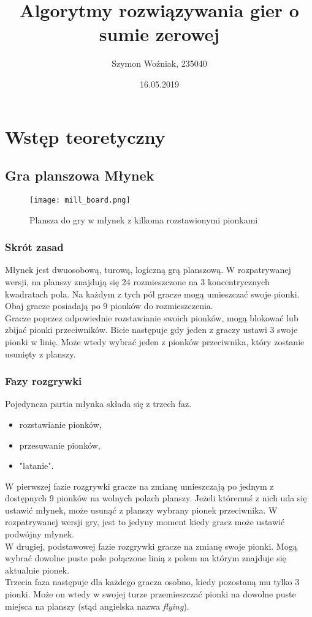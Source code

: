 \documentclass{article}
\author{Szymon Woźniak, 235040}
\date{16.05.2019}
\title{Algorytmy rozwiązywania gier o sumie zerowej}
\begin{document}
	\maketitle
	\newpage
	
	\section{Wstęp teoretyczny}
	\subsection{Gra planszowa Młynek}
	\begin{figure}[H]
		\centering
		\texttt{[image: mill\_board.png]}
		\caption{Plansza do gry w młynek z kilkoma rozstawionymi pionkami}
		\label{fig:board}
	\end{figure}
	\subsubsection{Skrót zasad}
	Młynek jest dwuosobową, turową, logiczną grą planszową. W rozpatrywanej wersji, na planszy znajdują się 24 rozmieszczone na 3 koncentrycznych kwadratach pola. Na każdym z tych pól gracze mogą umieszczać swoje pionki. Obaj gracze posiadają po 9 pionków do rozmieszczenia.\\
	Gracze poprzez odpowiednie rozstawianie swoich pionków, mogą blokować lub zbijać pionki przeciwników. Bicie następuje gdy jeden z graczy ustawi 3 swoje pionki w linię. Może wtedy wybrać jeden z pionków przeciwnika, który zostanie usunięty z planszy.\\
	\subsubsection{Fazy rozgrywki}
	Pojedyncza partia młynka składa się z trzech faz.
	\begin{itemize}
		\item rozstawianie pionków,
		\item przesuwanie pionków,
		\item "latanie".
	\end{itemize}
	W pierwszej fazie rozgrywki gracze na zmianę umieszczają po jednym z dostępnych 9 pionków na wolnych polach planszy. Jeżeli któremuś z nich uda się ustawić młynek, może usunąć z planszy wybrany pionek przeciwnika. W rozpatrywanej wersji gry, jest to jedyny moment kiedy gracz może ustawić podwójny młynek.\\
	W drugiej, podstawowej fazie rozgrywki gracze na zmianę swoje pionki. Mogą wybrać dowolne puste pole połączone linią z polem na którym znajduje się aktualnie pionek.\\
	Trzecia faza następuje dla każdego gracza osobno, kiedy pozostaną mu tylko 3 pionki. Może on wtedy w swojej turze przemieszczać pionki na dowolne puste miejsca na planszy (stąd angielska nazwa \textit{flying}).
\end{document}
